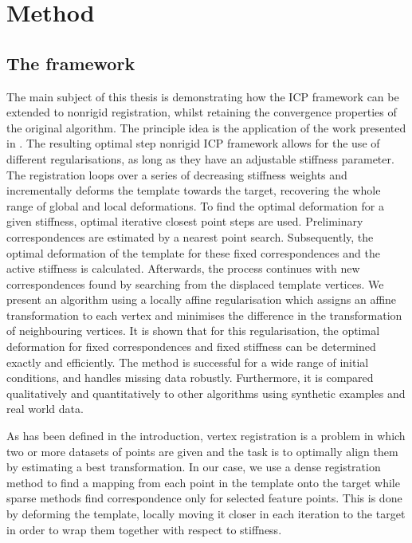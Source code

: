 \documentclass[../structure.tex]{subfiles}
\begin{document}
\chapter{Method}
\section{The framework}
\hspace{2em}The main subject of this thesis is demonstrating how the ICP framework can be extended to nonrigid registration, whilst retaining the convergence properties of the original algorithm. The principle idea is the application of the work presented in \cite{Amberg2007}. The resulting optimal step nonrigid ICP framework allows for the use of different regularisations, as long as they have an adjustable stiffness parameter. The registration loops over a series of decreasing stiffness weights and incrementally deforms the template towards the target, recovering the whole range of global and local deformations. To find the optimal deformation for a given stiffness, optimal iterative closest point steps are used. Preliminary correspondences are estimated by a nearest point search. Subsequently, the optimal deformation of the template for these fixed correspondences and the active stiffness is calculated. Afterwards, the process continues with new correspondences found by searching from the displaced template vertices. We present an algorithm using a locally affine regularisation which assigns an affine transformation to each vertex and minimises the difference in the transformation of neighbouring vertices. It is shown that for this regularisation, the optimal deformation for fixed correspondences and fixed stiffness can be determined exactly and efficiently. The method is successful for a wide range of initial conditions, and handles missing data robustly. Furthermore, it is compared qualitatively and quantitatively to other algorithms using synthetic examples and real world data.

\hspace{2em} As has been defined in the introduction, vertex registration is a problem in which two or more datasets of points are given and the task is to optimally align them by estimating a best transformation. In our case, we use a dense registration method to find a mapping from each point in the template onto the target while sparse methods find correspondence only for selected feature points. This is done by deforming the template, locally moving it closer in each iteration to the target in order to wrap them together with respect to stiffness.
\end{document}
